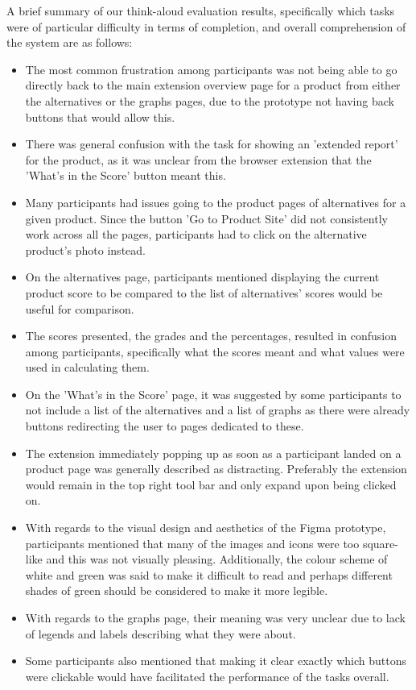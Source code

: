 \documentclass[a4,10pt,twocolumn]{article}
\begin{document}
A brief summary of our think-aloud evaluation results, specifically which tasks were of particular difficulty in terms of completion, and overall comprehension of the system are as follows:

\begin{itemize}
    \item The most common frustration among participants was not being able to go directly back to the main extension overview page for a product from either the alternatives or the graphs pages, due to the prototype not having back buttons that would allow this.
    \item There was general confusion with the task for showing an 'extended report' for the product, as it was unclear from the browser extension that the 'What's in the Score' button meant this.
    \item Many participants had issues going to the product pages of alternatives for a given product. Since the button 'Go to Product Site' did not consistently work across all the pages, participants had to click on the alternative product's photo instead.
    \item On the alternatives page, participants mentioned displaying the current product score to be compared to the list of alternatives' scores would be useful for comparison.
    \item The scores presented, the grades and the percentages, resulted in confusion among participants, specifically what the scores meant and what values were used in calculating them.
    \item On the 'What's in the Score' page, it was suggested by some participants to not include a list of the alternatives and a list of graphs as there were already buttons redirecting the user to pages dedicated to these.
    \item The extension immediately popping up as soon as a participant landed on a product page was generally described as distracting. Preferably the extension would remain in the top right tool bar and only expand upon being clicked on.
    \item With regards to the visual design and aesthetics of the Figma prototype, participants mentioned that many of the images and icons were too square-like and this was not visually pleasing. Additionally, the colour scheme of white and green was said to make it difficult to read and perhaps different shades of green should be considered to make it more legible.
    \item With regards to the graphs page, their meaning was very unclear due to lack of legends and labels describing what they were about.
    \item Some participants also mentioned that making it clear exactly which buttons were clickable would have facilitated the performance of the tasks overall.
\end{itemize}
\end{document}
